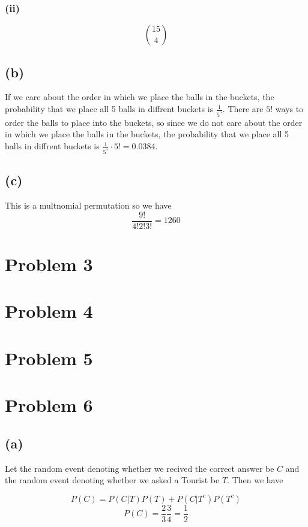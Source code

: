 \subsubsection*{(ii)}
$$\boxed{15 \choose 4}$$
\subsection{(b)}
If we care about the order in which we place the balls in the buckets, the probability that we place all 5 balls in diffrent buckets is $\frac{1}{5^5}$.
There are $5!$ ways to order the balls to place into the buckets, so since we do not care about
the order in which we place the balls in the buckets, the probability that we place all 5 balls in diffrent buckets is $\frac{1}{5^5}\cdot5!=0.0384
$.
\subsection*{(c)}
This is a multnomial permutation so we have
$$\frac{9!}{4!2!3!}=\boxed{1260}$$

\section*{Problem 3}
\section*{Problem 4}
\section*{Problem 5}
\section*{Problem 6}
\subsection*{(a)}
Let the random event denoting whether we recived the correct answer 
be $C$ and the random event denoting whether we asked a Tourist be 
$T$. Then we have

$$P(C)=P(C|T)P(T)+P(C|T^c)P(T^c)$$
$$P(C)=\frac{2}{3}\frac{3}{4}=\boxed{\frac{1}{2}}$$
